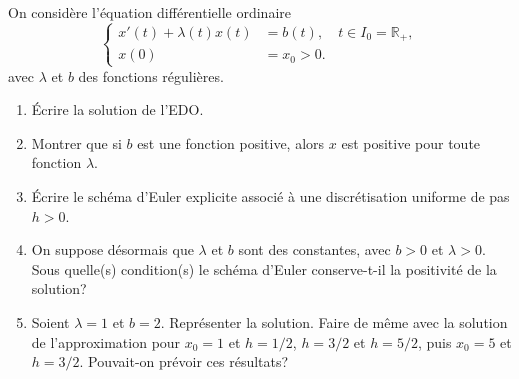 \documentclass[a4paper,12pt,reqno]{amsart}
\begin{document}
\begin{exo}

  On considère l'équation différentielle ordinaire
    \[
      \left \{
        \begin{aligned}
          x'(t)+\lambda(t)x(t) &= b(t), \quad t\in I_0=\mathbb{R}_+,\\
          x(0) &= x_0>0.
        \end{aligned}
      \right .
    \]
  avec $\lambda$ et $b$ des fonctions régulières.
  \begin{enumerate}
    \item Écrire la solution de l'EDO.
    \item Montrer que si $b$ est une fonction positive, alors $x$ est positive pour toute fonction $\lambda$.
    \item Écrire le schéma d'Euler explicite associé à une discrétisation uniforme de pas $h>0$.
    \item On suppose désormais que $\lambda$ et $b$ sont des constantes, avec $b>0$ et $\lambda>0$. Sous quelle(s) condition(s) le schéma d'Euler conserve-t-il la positivité de la solution?
    \item Soient $\lambda=1$ et $b=2$. Représenter la solution. Faire de même avec la solution de l'approximation pour $x_0=1$ et $h=1/2$, $h=3/2$ et $h=5/2$, puis $x_0=5$ et $h=3/2$. Pouvait-on prévoir ces résultats?
  \end{enumerate}
\end{exo}
\end{document}
